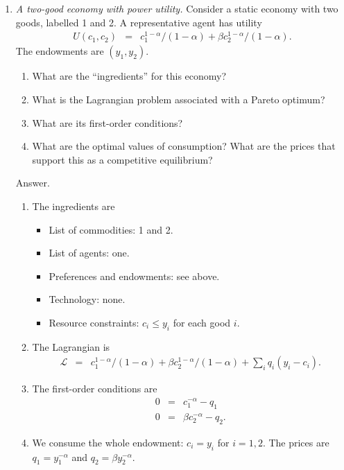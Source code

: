 \documentclass[11pt]{article}
\begin{document}
\begin{enumerate}
\item {\it A two-good economy with power utility.\/}
Consider a static economy with two goods,
labelled 1 and 2.
A representative agent has utility
\begin{eqnarray*}
    U(c_1,c_2) &=& c_1^{1-\alpha}/(1-\alpha) + \beta c_2^{1-\alpha}/(1-\alpha).
\end{eqnarray*}
The endowments are $(y_1, y_2)$.
\begin{enumerate}
\item What are the ``ingredients'' for this economy?
\item What is the Lagrangian problem associated with a Pareto optimum?
\item What are its first-order conditions?
\item What are the optimal values of consumption?
What are the prices that support this as a competitive equilibrium?
\end{enumerate}
%
Answer.
\begin{enumerate}
\item The ingredients are
\begin{itemize}
\item List of commodities:  1 and 2.
\item List of agents:  one.
\item Preferences and endowments:  see above.
\item Technology:  none.
\item Resource constraints:  $c_i \leq y_i$ for each good $i$.
\end{itemize}
\item The Lagrangian is
\begin{eqnarray*}
    \mathcal{L} &=& c_1^{1-\alpha}/(1-\alpha) + \beta c_2^{1-\alpha}/(1-\alpha)
            + \sum_i q_i (y_i - c_i) .
\end{eqnarray*}
\item The first-order conditions are
\begin{eqnarray*}
    0 &=& c_1^{-\alpha} - q_1  \\
    0 &=& \beta c_2^{-\alpha} - q_2 .
\end{eqnarray*}
\item We consume the whole endowment: $c_i = y_i$ for $i=1,2$.
The prices are $ q_1 = y_1^{-\alpha}$ and $q_2 = \beta y_2^{-\alpha}$.
\end{enumerate}



\end{enumerate}
\end{document}
